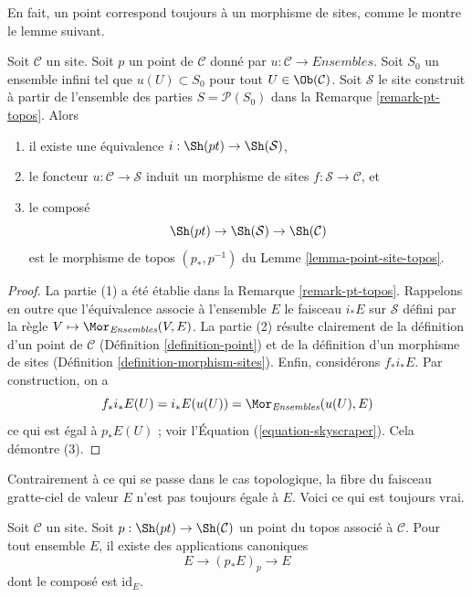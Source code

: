 \noindent
En fait, un point correspond toujours à un morphisme de sites, comme le montre
le lemme suivant.

\begin{lemma}
\label{lemma-site-point-morphism}
Soit $\mathcal{C}$ un site. Soit $p$ un point de $\mathcal{C}$ donné par
$u : \mathcal{C} \to \textit{Ensembles}$. Soit $S_0$ un ensemble infini tel que
$u(U) \subset S_0$ pour tout $U \in \Ob(\mathcal{C})$. Soit $\mathcal{S}$ le
site construit à partir de l’ensemble des parties
$S = \mathcal{P}(S_0)$ dans la Remarque \ref{remark-pt-topos}.
Alors
\begin{enumerate}
\item il existe une équivalence $i : \Sh(pt) \to \Sh(\mathcal{S})$,
\item le foncteur $u : \mathcal{C} \to \mathcal{S}$ induit un morphisme de
sites $f : \mathcal{S} \to \mathcal{C}$, et
\item le composé
$$
\Sh(pt) \to
\Sh(\mathcal{S}) \to
\Sh(\mathcal{C})
$$
est le morphisme de topos $(p_*, p^{-1})$ du
Lemme \ref{lemma-point-site-topos}.
\end{enumerate}
\end{lemma}

\begin{proof}
La partie (1) a été établie dans la Remarque \ref{remark-pt-topos}.
Rappelons en outre que l’équivalence associe à l’ensemble $E$ le faisceau
$i_*E$ sur $\mathcal{S}$ défini par la règle
$V \mapsto \Mor_{\textit{Ensembles}}(V, E)$.
La partie (2) résulte clairement de la définition d’un point de $\mathcal{C}$
(Définition \ref{definition-point}) et de la définition d’un morphisme de
sites (Définition \ref{definition-morphism-sites}).
Enfin, considérons $f_*i_*E$. Par construction, on a
$$
f_*i_*E(U) = i_*E(u(U)) = \Mor_{\textit{Ensembles}}(u(U), E)
$$
ce qui est égal à $p_*E(U)$ ; voir
l’Équation (\ref{equation-skyscraper}).
Cela démontre (3).
\end{proof}

\noindent
Contrairement à ce qui se passe dans le cas topologique, la fibre du faisceau
gratte-ciel de valeur $E$ n’est pas toujours égale à $E$. Voici ce qui est
toujours vrai.

\begin{lemma}
\label{lemma-stalk-skyscraper}
Soit $\mathcal{C}$ un site. Soit
$p : \Sh(pt) \to \Sh(\mathcal{C})$ un point du topos associé à
$\mathcal{C}$. Pour tout ensemble $E$, il existe des applications canoniques
$$
E \longrightarrow (p_*E)_p \longrightarrow E
$$
dont le composé est $\text{id}_E$.
\end{lemma}


